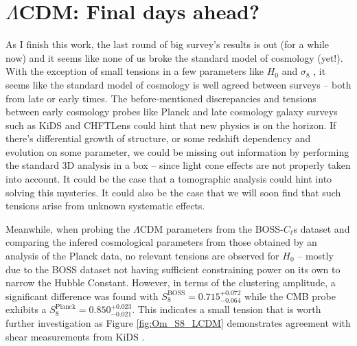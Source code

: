 \section{$\Lambda$CDM: Final days ahead?}
\label{sec:conclusion:sec2}
As I finish this work, the last round of big survey's results is out (for a while now) and it seems like none of us broke the standard model of cosmology (yet!). With the exception of small tensions in a few parameters like $H_0$ \citep{2018HubbleMortsell, Riess2018} and $\sigma_8$ \citep{2015MacCrann}, it seems like the standard model of cosmology is well agreed between surveys -- both from late or early times. The before-mentioned discrepancies and tensions between early cosmology probes like Planck \citep{2018PlanckCosmology} and late cosmology galaxy surveys such as KiDS \citep{2017MNRAS.465.1454H} and CHFTLens \citep{2014CHFTLens} could hint that new physics is on the horizon. If there's differential growth of structure, or some redshift dependency and evolution on some parameter, we could be missing out information by performing the standard 3D analysis in a box -- since light cone effects are not properly taken into account. It could be the case that a tomographic analysis could hint into solving this mysteries. It could also be the case that we will soon find that such tensions arise from unknown systematic effects.

\qquad Meanwhile, when probing the $\Lambda$CDM parameters from the BOSS-$C_{\ell}$s dataset and comparing the infered cosmological parameters from those obtained by an analysis of the Planck data, no relevant tensions are observed for $H_0$ -- mostly due to the BOSS dataset not having sufficient constraining power on its own to narrow the Hubble Constant. However, in terms of the clustering amplitude, a significant difference was found with $S_8^{\text{BOSS}} = 0.715^{+0.072}_{-0.064}$ while the CMB probe exhibits a $S_8^{\text{Planck}} = 0.850^{+0.023}_{-0.021}$. This indicates a small tension that is worth further investigation as Figure \ref{fig:Om_S8_LCDM} demonstrates agreement with shear measurements from KiDS \citep{2017MNRAS.465.1454H}.

